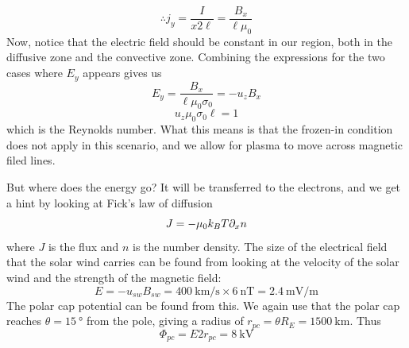 \begin{equation*}
    \therefore j_y=\frac{I}{x2\ell}=\frac{B_x}{\ell\mu_0}
\end{equation*}
Now, notice that the electric field should be constant in our region, both in the diffusive zone and the convective zone. Combining the expressions for the two cases where \(E_y\) appears gives us
\begin{equation*}
    E_y=\frac{B_x}{\ell\mu_0\sigma_0}=-u_{z}B_x
\end{equation*}
\begin{equation}\label{eq:L8_ell_relation_reynold}
    u_z\mu_0\sigma_0\ell=1
\end{equation}
which is the Reynolds number. What this means is that the frozen-in condition does not apply in this scenario, and we allow for plasma to move across magnetic filed lines.

But where does the energy go? It will be transferred to the electrons, and we get a hint by looking at Fick's law of diffusion
\begin{equation*}
    J=-\mu_0k_{B}T\partial_{x}n
\end{equation*}
where \(J\) is the flux and \(n\) is the number density. The size of the electrical field that the solar wind carries can be found from looking at the velocity of the solar wind and the strength of the magnetic field:
\begin{equation*}
    E=-u_{sw}B_{sw}=\SI{400}{\kilo\metre/\second}\times\SI{6}{\nano\tesla}=\SI{2.4}{\milli\volt/\metre}
\end{equation*}
The polar cap potential can be found from this. We again use that the polar cap reaches \(\theta=\SI{15}{\degree}\) from the pole, giving a radius of \(r_{pc}=\theta R_E=\SI{1500}{\kilo\metre}\). Thus
\begin{equation*}
    \Phi_{pc}=E2r_{pc}=\SI{8}{\kilo\volt}
\end{equation*}

